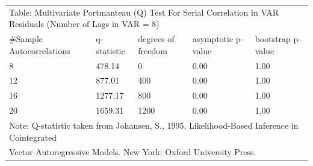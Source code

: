 \documentclass{article}
\begin{document}
 \begin{tabular}{lllll} 
 \multicolumn{5}{l}{Table: Multivariate Portmanteau (Q) Test For Serial 
     Correlation in VAR Residuals (Number of Lags in VAR =  8)} \\ 
 \#Sample Autocorrelations & q-statistic & degrees of freedom & asymptotic 
     p-value & bootstrap p-value \\ 
   8   & 478.14 &   0 & 0.00 & 1.00 \\  
  12   & 877.01 & 400 & 0.00 & 1.00 \\  
  16   & 1277.17 & 800 & 0.00 & 1.00 \\  
  20   & 1659.31 & 1200 & 0.00 & 1.00 \\ 
 \multicolumn{5}{l}{Note: Q-statistic taken from Johansen, S., 1995, 
 Likelihood-Based Inference in Cointegrated } \\  
 \multicolumn{5}{l}{Vector Autoregressive Models. New York: Oxford University 
 Press.} 
   \end{tabular} 
\end{document}
